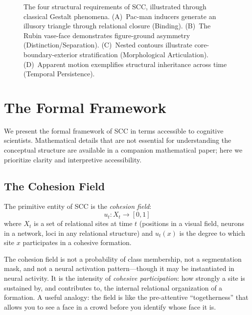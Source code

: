 \documentclass[lettersize,journal]{IEEEtran}
\begin{document}
\begin{figure}[!t]
\caption{The four structural requirements of SCC, illustrated through classical Gestalt phenomena. (A)~Pac-man inducers generate an illusory triangle through relational closure (Binding). (B)~The Rubin vase-face demonstrates figure-ground asymmetry (Distinction/Separation). (C)~Nested contours illustrate core-boundary-exterior stratification (Morphological Articulation). (D)~Apparent motion exemplifies structural inheritance across time (Temporal Persistence).}
\label{fig:gestalt}
\end{figure}

\section{The Formal Framework}

We present the formal framework of SCC in terms accessible to cognitive scientists. Mathematical details that are not essential for understanding the conceptual structure are available in a companion mathematical paper; here we prioritize clarity and interpretive accessibility.

\subsection{The Cohesion Field}

The primitive entity of SCC is the \emph{cohesion field}:
\begin{equation}
u_t : X_t \to [0,1]
\end{equation}
where $X_t$ is a set of relational sites at time $t$ (positions in a visual field, neurons in a network, loci in any relational structure) and $u_t(x)$ is the degree to which site $x$ participates in a cohesive formation.

The cohesion field is not a probability of class membership, not a segmentation mask, and not a neural activation pattern---though it may be instantiated in neural activity. It is the intensity of \emph{cohesive participation}: how strongly a site is sustained by, and contributes to, the internal relational organization of a formation. A useful analogy: the field is like the pre-attentive ``togetherness'' that allows you to see a face in a crowd before you identify whose face it is.
\end{document}
